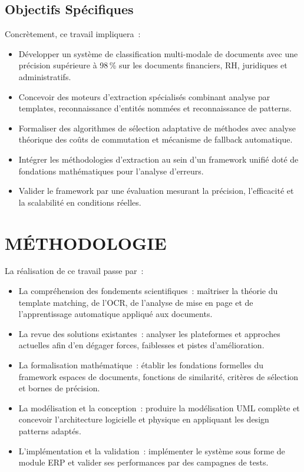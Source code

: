 \subsection*{Objectifs Spécifiques}
Concrètement, ce travail impliquera~:
\begin{itemize}[label=, font=\large \color{darkgray}]
\item Développer un système de classification multi-modale de documents avec une précision supérieure à 98\,\% sur les documents financiers, RH, juridiques et administratifs.
\item Concevoir des moteurs d'extraction spécialisés combinant analyse par templates, reconnaissance d'entités nommées et reconnaissance de patterns.
\item Formaliser des algorithmes de sélection adaptative de méthodes avec analyse théorique des coûts de commutation et mécanisme de fallback automatique.
\item Intégrer les méthodologies d'extraction au sein d'un framework unifié doté de fondations mathématiques pour l'analyse d'erreurs.
\item Valider le framework par une évaluation mesurant la précision, l'efficacité et la scalabilité en conditions réelles.
\end{itemize}

\section*{\color{darkgray}MÉTHODOLOGIE}
La réalisation de ce travail passe par~:
\begin{itemize}[label=, font=\large \color{darkgray}]
\item La compréhension des fondements scientifiques~: maîtriser la théorie du template matching, de l'OCR, de l'analyse de mise en page et de l'apprentissage automatique appliqué aux documents.

\item La revue des solutions existantes~: analyser les plateformes et approches actuelles afin d'en dégager forces, faiblesses et pistes d'amélioration.

\item La formalisation mathématique~: établir les fondations formelles du framework  espaces de documents, fonctions de similarité, critères de sélection et bornes de précision.

\item La modélisation et la conception~: produire la modélisation UML complète et concevoir l'architecture logicielle et physique en appliquant les design patterns adaptés.

\item L'implémentation et la validation~: implémenter le système sous forme de module ERP et valider ses performances par des campagnes de tests.
\end{itemize}

